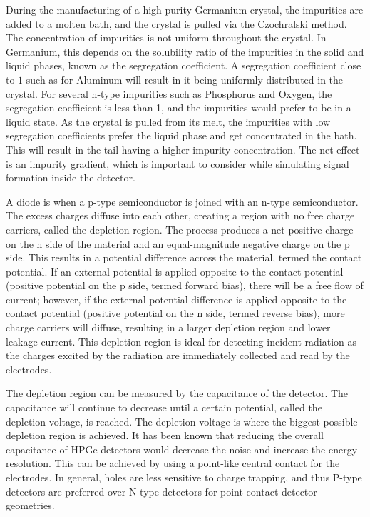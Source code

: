 During the manufacturing of a high-purity Germanium crystal, the impurities are added to a molten bath, and the crystal is pulled via the Czochralski method. The concentration of impurities is not uniform throughout the crystal. In Germanium, this depends on the solubility ratio of the impurities in the solid and liquid phases, known as the segregation coefficient. A segregation coefficient close to $1$ such as for Aluminum will result in it being uniformly distributed in the crystal. For several n-type impurities such as Phosphorus and Oxygen, the segregation coefficient is less than 1, and the impurities would prefer to be in a liquid state. As the crystal is pulled from its melt, the impurities with low segregation coefficients prefer the liquid phase and get concentrated in the bath. This will result in the tail having a higher impurity concentration. The net effect is an impurity gradient, which is important to consider while simulating signal formation inside the detector.

A diode is when a p-type semiconductor is joined with an n-type semiconductor. The excess charges diffuse into each other, creating a region with no free charge carriers, called the depletion region. The process produces a net positive charge on the n side of the material and an equal-magnitude negative charge on the p side. This results in a potential difference across the material, termed the contact potential. If an external potential is applied opposite to the contact potential (positive potential on the p side, termed forward bias), there will be a free flow of current; however, if the external potential difference is applied opposite to the contact potential (positive potential on the n side, termed reverse bias), more charge carriers will diffuse, resulting in a larger depletion region and lower leakage current. This depletion region is ideal for detecting incident radiation as the charges excited by the radiation are immediately collected and read by the electrodes.

The depletion region can be measured by the capacitance of the detector. The capacitance will continue to decrease until a certain potential, called the depletion voltage, is reached. The depletion voltage is where the biggest possible depletion region is achieved. It has been known that reducing the overall capacitance of HPGe detectors would decrease the noise and increase the energy resolution. This can be achieved by using a point-like central contact for the electrodes. In general, holes are less sensitive to charge trapping, and thus P-type detectors are preferred over N-type detectors for point-contact detector geometries.

